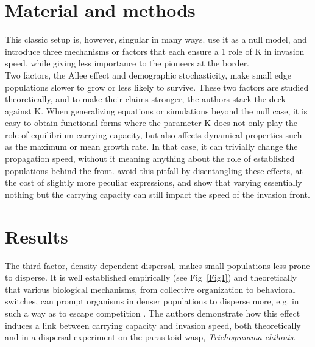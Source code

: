 \documentclass[a4paper]{article}
\begin{document}
\section*{\centering Material and methods}

This classic setup is, however, singular in many ways. \textcite{levins1971regional} use it as a null model, and introduce three mechanisms or factors that each ensure a 1 role of K in invasion speed, while giving less importance to the pioneers at the border. \\ 

Two factors, the Allee effect and demographic stochasticity, make small edge populations slower to grow or less likely to survive. These two factors are studied theoretically, and to make their claims stronger, the authors stack the deck against K. When generalizing equations or simulations beyond the null case, it is easy to obtain functional forms where the parameter K does not only play the role of equilibrium carrying capacity, but also affects dynamical properties such as the maximum or mean growth rate. In that case, it can trivially change the propagation speed, without it meaning anything about the role of established populations behind the front. \textcite{levins1971regional} avoid this pitfall by disentangling these effects, at the cost of slightly more peculiar expressions, and show that varying essentially nothing but the carrying capacity can still impact the speed of the invasion front. \\ 

\section*{\centering Results}
The third factor, density-dependent dispersal, makes small populations less prone to disperse. It is well established empirically (see Fig~\ref{Fig1}) and theoretically that various biological mechanisms, from collective organization to behavioral switches, can prompt organisms in denser populations to disperse more, e.g. in such a way as to escape competition \parencite{matthysen2005density}. The authors demonstrate how this effect induces a link between carrying capacity and invasion speed, both theoretically and in a dispersal experiment on the parasitoid wasp, \emph{Trichogramma chilonis}.\\ 
\end{document}
